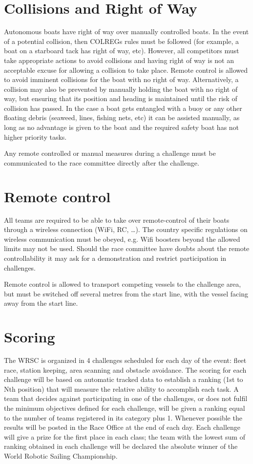 \documentclass[12pt]{article}
\begin{document}
\section{Collisions and Right of Way}
Autonomous boats have right of way over manually controlled boats. In the event
of a potential
collision, then COLREGs rules must be followed (for example, a boat on a
starboard tack has
right of way, etc). However, all competitors must take appropriate actions to
avoid collisions
and having right of way is not an acceptable excuse for allowing a collision to
take place.
Remote control is allowed to avoid imminent collisions for the boat with no 
right of way. Alternatively, a collision may also be
prevented by manually holding the boat with no right of way, but ensuring that 
its position and heading is maintained until the risk of collision has passed. 
In the case a boat gets entangled with a buoy or any other
floating debris (seaweed, lines, fishing nets, etc) it can be assisted manually,
as long as no advantage is given to the boat and the required safety boat has
not higher priority tasks.

Any remote controlled or manual measures during a challenge must be
communicated to the race committee directly after the challenge.

\section{Remote control}
All teams are required to be able to take over remote-control of their boats
through a wireless connection (WiFi, RC, \ldots). The country specific 
regulations on wireless communication must be obeyed, e.g. Wifi boosters beyond
the allowed limits may not be used.
Should the race committee have doubts about the remote controllability it may
ask for a demonstration and restrict participation in challenges.

Remote control is allowed to transport competing vessels to the challenge area,
but must be switched off several metres from the start line, with the vessel
facing away from the start line.


\section{Scoring}
The WRSC is organized in 4 challenges scheduled for each day of the event: fleet
race, station keeping, area scanning and obstacle avoidance. The scoring for each 
challenge will be based on automatic tracked data to establish a ranking 
(1st to Nth position) that will measure the relative
ability to accomplish each task. A team that decides against participating in
one of the challenges, or does not fulfil the minimum objectives defined for
each challenge, will be given a ranking equal to the number of teams registered 
in its category plus 1. Whenever possible
the results will be posted in the Race Office at the end of each day.
Each challenge will give a prize for the first place in each class; the team
with the lowest sum of ranking obtained in each challenge will be declared the
absolute winner of the World Robotic Sailing Championship.
\end{document}
